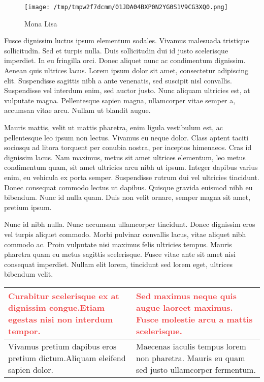\documentclass[12pt,a4paper]{article}%
\begin{document}
\begin{figure}[h!]%
\centering%
\texttt{[image: /tmp/tmpw2f7dcmm/01JDA04BXP0N2YG0S1V9CG3XQ0.png]}%
\caption{Mona Lisa}%
\end{figure}

%
Fusce dignissim luctus ipsum elementum sodales. Vivamus malesuada tristique sollicitudin. Sed et turpis nulla. Duis sollicitudin dui id justo scelerisque imperdiet. In eu fringilla orci. Donec aliquet nunc ac condimentum dignissim. Aenean quis ultrices lacus. Lorem ipsum dolor sit amet, consectetur adipiscing elit. Suspendisse sagittis nibh a ante venenatis, sed suscipit nisl convallis. Suspendisse vel interdum enim, sed auctor justo. Nunc aliquam ultricies est, at vulputate magna. Pellentesque sapien magna, ullamcorper vitae semper a, accumsan vitae arcu. Nullam ut blandit augue.%
\begin{justify}%
Mauris mattis, velit ut mattis pharetra, enim ligula vestibulum est, ac pellentesque leo ipsum non lectus. Vivamus eu neque dolor. Class aptent taciti sociosqu ad litora torquent per conubia nostra, per inceptos himenaeos. Cras id dignissim lacus. Nam maximus, metus sit amet ultrices elementum, leo metus condimentum quam, sit amet ultricies arcu nibh ut ipsum. Integer dapibus varius enim, eu vehicula ex porta semper. Suspendisse rutrum dui vel ultricies tincidunt. Donec consequat commodo lectus ut dapibus. Quisque gravida euismod nibh eu bibendum. Nunc id nulla quam. Duis non velit ornare, semper magna sit amet, pretium ipsum.%
\end{justify}%
\begin{justify}%
Nunc id nibh nulla. Nunc accumsan ullamcorper tincidunt. Donec dignissim eros vel turpis aliquet commodo. Morbi pulvinar convallis lacus, vitae aliquet nibh commodo ac. Proin vulputate nisi maximus felis ultricies tempus. Mauris pharetra quam eu metus sagittis scelerisque. Fusce vitae ante sit amet nisi consequat imperdiet. Nullam elit lorem, tincidunt sed lorem eget, ultrices bibendum velit.%
\end{justify}%


\begin{table}[h!]%
\centering%
\begin{tabular}{p{0.5\linewidth} p{0.5\linewidth}}%
\hline%
\textcolor[HTML]{ef4444}{\textbf{Curabitur scelerisque ex at dignissim congue.}}\newline \textcolor[HTML]{ef4444}{\textbf{Etiam egestas nisi non interdum tempor.}}&\textcolor[HTML]{ef4444}{\textbf{Sed maximus neque quis augue laoreet maximus. Fusce molestie arcu a mattis scelerisque. }}\\%
\hline%
Vivamus pretium dapibus eros pretium dictum.\newline Aliquam eleifend sapien dolor. &Maecenas iaculis tempus lorem non pharetra. Mauris eu quam sed justo ullamcorper fermentum.\\%
\hline%
\end{tabular}%
\end{table}
\end{document}
